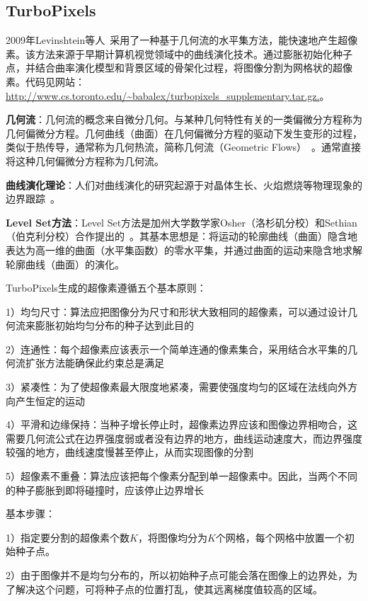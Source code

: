\documentclass[12pt]{article}
\begin{document}
\subsection{TurboPixels}

2009年Levinshtein等人~\cite{levinshtein2009turbopixels}采用了一种基于几何流的水平集方法，能快速地产生超像素。该方法来源于早期计算机视觉领域中的曲线演化技术。通过膨胀初始化种子点，并结合曲率演化模型和背景区域的骨架化过程，将图像分割为网格状的超像素。代码见网站：\url{http://www.cs.toronto.edu/~babalex/turbopixels_supplementary.tar.gz.}。

\textbf{几何流}：几何流的概念来自微分几何。与某种几何特性有关的一类偏微分方程称为几何偏微分方程。几何曲线（曲面）在几何偏微分方程的驱动下发生变形的过程，类似于热传导，通常称为几何热流，简称几何流（Geometric Flows）~\cite{sapiro2006geometric, bakas2005algebraic}。通常直接将这种几何偏微分方程称为几何流。

\textbf{曲线演化理论}：人们对曲线演化的研究起源于对晶体生长、火焰燃烧等物理现象的边界跟踪~\cite{sethian1985curvature}。

\textbf{Level Set方法}：Level Set方法是加州大学数学家Osher（洛杉矶分校）和Sethian（伯克利分校）合作提出的~\cite{osher1988fronts}。其基本思想是：将运动的轮廓曲线（曲面）隐含地表达为高一维的曲面（水平集函数）的零水平集，并通过曲面的运动来隐含地求解轮廓曲线（曲面）的演化。

TurboPixels生成的超像素遵循五个基本原则：

1）均匀尺寸：算法应把图像分为尺寸和形状大致相同的超像素，可以通过设计几何流来膨胀初始均匀分布的种子达到此目的

2）连通性：每个超像素应该表示一个简单连通的像素集合，采用结合水平集的几何流扩张方法能确保此约束总是满足

3）紧凑性：为了使超像素最大限度地紧凑，需要使强度均匀的区域在法线向外方向产生恒定的运动

4）平滑和边缘保持：当种子增长停止时，超像素边界应该和图像边界相吻合，这需要几何流公式在边界强度弱或者没有边界的地方，曲线运动速度大，而边界强度较强的地方，曲线速度慢甚至停止，从而实现图像的分割

5）超像素不重叠：算法应该把每个像素分配到单一超像素中。因此，当两个不同的种子膨胀到即将碰撞时，应该停止边界增长

基本步骤：

1）指定要分割的超像素个数$K$，将图像均分为$K$个网格，每个网格中放置一个初始种子点。

2）由于图像并不是均匀分布的，所以初始种子点可能会落在图像上的边界处，为了解决这个问题，可将种子点的位置打乱，使其远离梯度值较高的区域。
\end{document}
